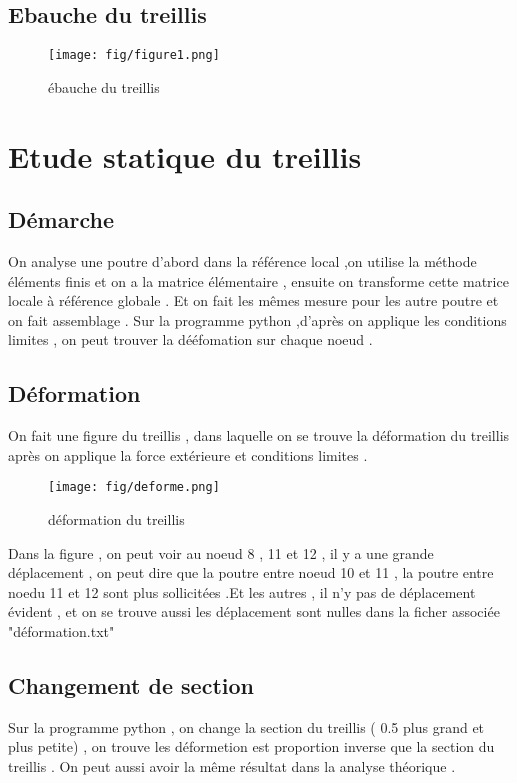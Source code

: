 \documentclass[a4paper,10pt]{report} %
\begin{document}
\section{Ebauche du treillis}


\begin{figure}[h]
\centering
\texttt{[image: fig/figure1.png]}
\caption{ébauche du treillis}
\end{figure}



\chapter{Etude statique du treillis}
\section{Démarche}
On analyse une poutre d'abord dans la référence local ,on utilise la méthode éléments finis et on a la matrice élémentaire , ensuite on transforme cette matrice locale à référence globale . Et on fait les mêmes mesure pour les autre poutre et on fait assemblage . Sur la programme python ,d'après on applique les conditions limites , on peut trouver la dééfomation sur chaque noeud .
\section{Déformation}
On fait une figure du treillis , dans laquelle on se trouve la déformation du treillis après on applique la force extérieure et conditions limites . 
\begin{figure}[h]
\centering
\texttt{[image: fig/deforme.png]}
\caption{déformation du treillis}
\end{figure}

Dans la figure , on peut voir au noeud 8 , 11 et 12 , il y a une grande déplacement , on peut dire que la poutre entre noeud 10 et 11 , la poutre entre noedu 11 et 12 sont plus sollicitées .Et les autres , il n'y pas de déplacement évident , et on se trouve aussi les déplacement sont nulles dans la ficher associée "déformation.txt"
\section{Changement de section}
Sur la programme python , on change la section du treillis ( 0.5 plus grand et plus petite) , on trouve les déformetion est proportion inverse que la section du treillis . On peut aussi avoir la même résultat dans la analyse théorique .
\end{document}
